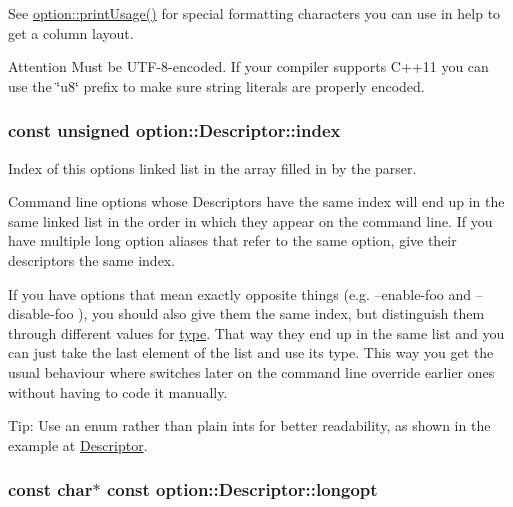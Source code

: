 See \hyperlink{namespaceoption_afc8bb7e040a98a0b33ff1ce9da1be0d1}{option\+::print\+Usage()} for special formatting characters you can use in {\ttfamily help} to get a column layout.

\begin{DoxyAttention}{Attention}
Must be U\+T\+F-\/8-\/encoded. If your compiler supports C++11 you can use the \char`\"{}u8\char`\"{} prefix to make sure string literals are properly encoded. 
\end{DoxyAttention}
\subsubsection[{\texorpdfstring{index}{index}}]{\setlength{\rightskip}{0pt plus 5cm}const unsigned option\+::\+Descriptor\+::index}\hypertarget{structoption_1_1Descriptor_a1fee8ac44f529c99ac2b1149b4c391b1}{}\label{structoption_1_1Descriptor_a1fee8ac44f529c99ac2b1149b4c391b1}


Index of this option\textquotesingle{}s linked list in the array filled in by the parser. 

Command line options whose Descriptors have the same index will end up in the same linked list in the order in which they appear on the command line. If you have multiple long option aliases that refer to the same option, give their descriptors the same {\ttfamily index}.

If you have options that mean exactly opposite things (e.\+g. {\ttfamily --enable-\/foo} and {\ttfamily --disable-\/foo} ), you should also give them the same {\ttfamily index}, but distinguish them through different values for \hyperlink{structoption_1_1Descriptor_a1b220dabd8aad075fa441a80f9b9343c}{type}. That way they end up in the same list and you can just take the last element of the list and use its type. This way you get the usual behaviour where switches later on the command line override earlier ones without having to code it manually.

\begin{DoxyParagraph}{Tip\+:}
Use an enum rather than plain ints for better readability, as shown in the example at \hyperlink{structoption_1_1Descriptor}{Descriptor}. 
\end{DoxyParagraph}
\subsubsection[{\texorpdfstring{longopt}{longopt}}]{\setlength{\rightskip}{0pt plus 5cm}const char$\ast$ const option\+::\+Descriptor\+::longopt}\hypertarget{structoption_1_1Descriptor_a470c449dfa894c9bfda2dae026142b4b}{}\label{structoption_1_1Descriptor_a470c449dfa894c9bfda2dae026142b4b}


